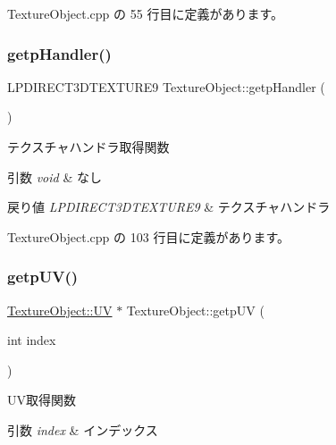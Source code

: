  Texture\+Object.\+cpp の 55 行目に定義があります。

\mbox{\label{class_texture_object_a5d6976d20349c77be424fb6a7cacabc8}} 
\subsubsection{\texorpdfstring{getp\+Handler()}{getpHandler()}}
{\footnotesize\ttfamily L\+P\+D\+I\+R\+E\+C\+T3\+D\+T\+E\+X\+T\+U\+R\+E9 Texture\+Object\+::getp\+Handler (\begin{DoxyParamCaption}{ }\end{DoxyParamCaption})}



テクスチャハンドラ取得関数 


\begin{DoxyParams}{引数}
{\em void} & なし \\
\hline
\end{DoxyParams}

\begin{DoxyRetVals}{戻り値}
{\em L\+P\+D\+I\+R\+E\+C\+T3\+D\+T\+E\+X\+T\+U\+R\+E9} & テクスチャハンドラ \\
\hline
\end{DoxyRetVals}


 Texture\+Object.\+cpp の 103 行目に定義があります。

\mbox{\label{class_texture_object_a9ccebedf94db3aeef0f3ccc28cc686b7}} 
\subsubsection{\texorpdfstring{getp\+U\+V()}{getpUV()}}
{\footnotesize\ttfamily \mbox{\hyperlink{class_texture_object_1_1_u_v}{Texture\+Object\+::\+UV}} $\ast$ Texture\+Object\+::getp\+UV (\begin{DoxyParamCaption}\item[{int}]{index }\end{DoxyParamCaption})}



U\+V取得関数 


\begin{DoxyParams}{引数}
{\em index} & インデックス \\
\hline
\end{DoxyParams}

